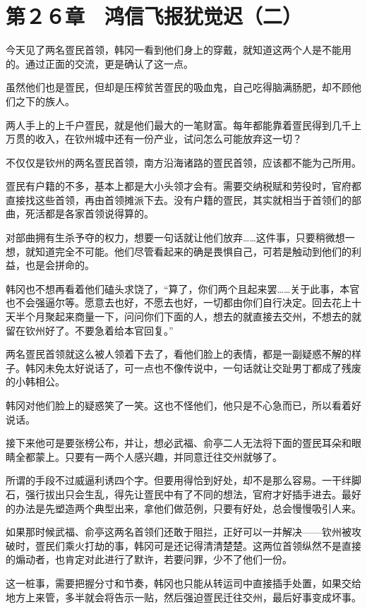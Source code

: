 \section{第２６章　鸿信飞报犹觉迟（二）}

今天见了两名疍民首领，韩冈一看到他们身上的穿戴，就知道这两个人是不能用的。通过正面的交流，更是确认了这一点。

虽然他们也是疍民，但却是压榨贫苦疍民的吸血鬼，自己吃得脑满肠肥，却不顾他们之下的族人。

两人手上的上千户疍民，就是他们最大的一笔财富。每年都能靠着疍民得到几千上万贯的收入，在钦州城中还有一份产业，试问怎么可能放弃这一切？

不仅仅是钦州的两名疍民首领，南方沿海诸路的疍民首领，应该都不能为己所用。

疍民有户籍的不多，基本上都是大小头领才会有。需要交纳税赋和劳役时，官府都直接找这些首领，再由首领摊派下去。没有户籍的疍民，其实就相当于首领们的部曲，死活都是各家首领说得算的。

对部曲拥有生杀予夺的权力，想要一句话就让他们放弃……这件事，只要稍微想一想，就知道完全不可能。他们尽管看起来的确是畏惧自己，可若是触动到他们的利益，也是会拼命的。

韩冈也不想再看着他们磕头求饶了，“算了，你们两个且起来罢……关于此事，本官也不会强逼尔等。愿意去也好，不愿去也好，一切都由你们自行决定。回去花上十天半个月聚起来商量一下，问问你们下面的人，想去的就直接去交州，不想去的就留在钦州好了。不要急着给本官回复。”

两名疍民首领就这么被人领着下去了，看他们脸上的表情，都是一副疑惑不解的样子。韩冈未免太好说话了，可一点也不像传说中，一句话就让交趾男丁都成了残废的小韩相公。

韩冈对他们脸上的疑惑笑了一笑。这也不怪他们，他只是不心急而已，所以看着好说话。

接下来他可是要张榜公布，并让，想必武福、俞亭二人无法将下面的疍民耳朵和眼睛全都蒙上。只要有一两个人感兴趣，并同意迁往交州就够了。

所谓的手段不过威逼利诱四个字。但要用得恰到好处，却不是那么容易。一干绊脚石，强行拔出只会生乱，得先让疍民中有了不同的想法，官府才好插手进去。最好的办法是先塑造两个典型出来，拿他们做范例，只要有好处，总会慢慢吸引人来。

如果那时候武福、俞亭这两名首领们还敢于阻拦，正好可以一并解决——钦州被攻破时，疍民们乘火打劫的事，韩冈可是还记得清清楚楚。这两位首领纵然不是直接的煽动者，也肯定对此进行了默许，若要问罪，少不了他们一份。

这一桩事，需要把握分寸和节奏，韩冈也只能从转运司中直接插手处置，如果交给地方上来管，多半就会将告示一贴，然后强迫疍民迁往交州，最后好事变成坏事。

